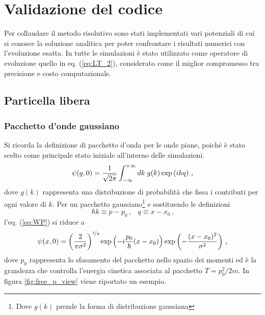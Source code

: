 \chapter{Validazione del codice}
\label{ch:Validazione}

Per collaudare %
il metodo risolutivo sono stati implementati vari potenziali di cui si conosce la soluzione analitica per poter confrontare i risultati numerici con l'evoluzione esatta. In tutte le simulazioni è stato utilizzato come operatore di evoluzione quello in eq. (\ref{eq:LT_2}), considerato come il miglior compromesso tra precisione e costo computazionale.


\section{Particella libera}
\label{sec:free}

\subsection{Pacchetto d'onde gaussiano}
\label{sec:WP_gaussiano}

Si ricorda la definizione di pacchetto d'onda per le onde piane, poiché è stato scelto come principale stato iniziale all'interno delle simulazioni.
\begin{equation}
    \centering
    \psi(q, 0) = \frac{1}{\sqrt{2 \pi}} \int_{- \infty}^{+ \infty} dk \; g(k) \exp \left(ikq\right) \, \text{,}
    \label{eq:WP}
\end{equation}
dove $g(k)$ rappresenta una distribuzione di probabilità che fissa i contributi per ogni valore di $k$.
Per un pacchetto gaussiano\footnote{Dove $g(k)$ prende la forma di distribuzione gaussiana} e sostituendo le definizioni
\begin{equation}
    \hbar k \equiv p - p_0 \, \text{,}   \quad q \equiv x - x_0 \, \text{,}
    \label{eq:def_kq}
\end{equation}
l'eq. (\ref{eq:WP}) si riduce a 
\begin{equation}
    \centering
    \psi(x, 0) = \left( \frac{2}{ \pi \sigma^2} \right)^{\nicefrac{1}{4}} \exp \left(-i \frac{p_{0}}{\hbar} (x -x_0)\right) \exp \left(-\frac{(x -x_0)^2}{\sigma^{2}}\right) \, \text{,}
    \label{eq:WP_gaus}
\end{equation}
dove $p_0$ rappresenta lo sfasamento del pacchetto nello spazio dei momenti ed è la grandezza che controlla l'energia cinetica associata al pacchetto $T = p_{0}^{2} / 2m$. In figura {\ref{fig:free_p_view}} viene riportato un esempio.

